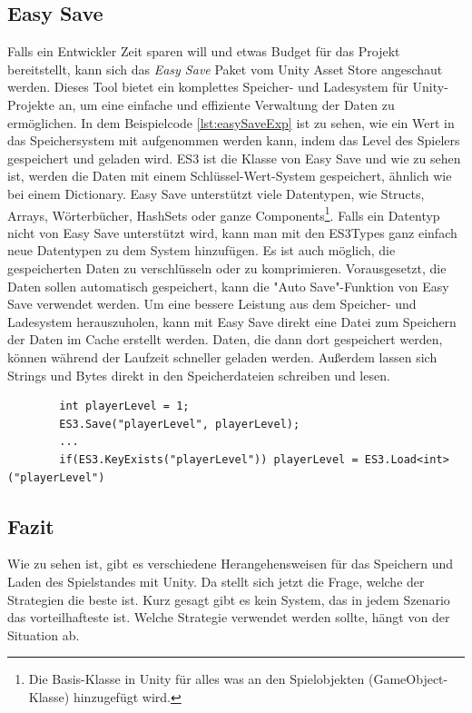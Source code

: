 \subsection{Easy Save}
Falls ein Entwickler Zeit sparen will und etwas Budget für das Projekt bereitstellt, kann sich das \textit{Easy Save} Paket vom Unity Asset Store angeschaut werden. Dieses Tool bietet ein komplettes Speicher- und Ladesystem für Unity-Projekte an, um eine einfache und effiziente Verwaltung der Daten zu ermöglichen.\cite{unityEasySave} In dem Beispielcode \ref{lst:easySaveExp} ist zu sehen, wie ein Wert in das Speichersystem mit aufgenommen werden kann, indem das Level des Spielers gespeichert und geladen wird. ES3 ist die Klasse von Easy Save und wie zu sehen ist, werden die Daten mit einem Schlüssel-Wert-System gespeichert, ähnlich wie bei einem Dictionary.\cite{moodkieGettingStarted} Easy Save unterstützt viele Datentypen, wie Structs, Arrays, Wörterbücher, HashSets oder ganze Components\footnote{Die Basis-Klasse in Unity für alles was an den Spielobjekten (GameObject-Klasse) hinzugefügt wird.\cite{unityComponent}}.\cite{moodkieSupportedTypes} Falls ein Datentyp nicht von Easy Save unterstützt wird, kann man mit den ES3Types ganz einfach neue Datentypen zu dem System hinzufügen.\cite{moodkieChoosingWhat} Es ist auch möglich, die gespeicherten Daten zu verschlüsseln oder zu komprimieren.\cite{moodkieGettingStarted} Vorausgesetzt, die Daten sollen automatisch gespeichert, kann die "Auto Save"-Funktion von Easy Save verwendet werden.\cite{moodkieAutoSave} Um eine bessere Leistung aus dem Speicher- und Ladesystem herauszuholen, kann mit Easy Save direkt eine Datei zum Speichern der Daten im Cache erstellt werden. Daten, die dann dort gespeichert werden, können während der Laufzeit schneller geladen werden.\cite{moodkieImprovingPerformance} Außerdem lassen sich Strings und Bytes direkt in den Speicherdateien schreiben und lesen.\cite{moodkieSavingLoading} 

\begin{listing}[htp]
    \begin{verbatim} 
        int playerLevel = 1;
        ES3.Save("playerLevel", playerLevel);
        ... 
        if(ES3.KeyExists("playerLevel")) playerLevel = ES3.Load<int>("playerLevel")
    \end{verbatim}
    \caption{Beispiel für das Speichern und Laden mit Easy Save}
    \label{lst:easySaveExp}
\end{listing}



\subsection{Fazit}
Wie zu sehen ist, gibt es verschiedene Herangehensweisen für das Speichern und Laden des Spielstandes mit Unity. Da stellt sich jetzt die Frage, welche der Strategien die beste ist. Kurz gesagt gibt es kein System, das in jedem Szenario das vorteilhafteste ist. Welche Strategie verwendet werden sollte, hängt von der Situation ab. 

